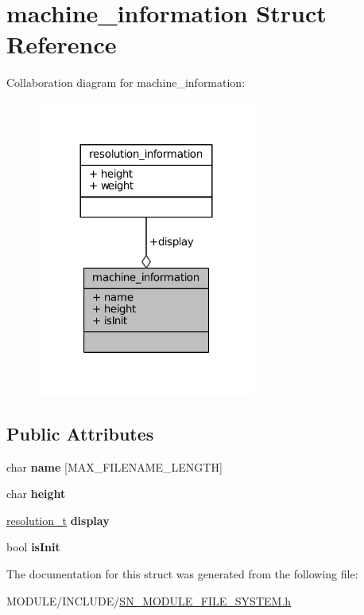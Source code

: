 \hypertarget{structmachine__information}{}\section{machine\+\_\+information Struct Reference}
\label{structmachine__information}


Collaboration diagram for machine\+\_\+information\+:\nopagebreak
\begin{figure}[H]
\begin{center}
\leavevmode
\includegraphics[width=204pt]{structmachine__information__coll__graph}
\end{center}
\end{figure}
\subsection*{Public Attributes}
\begin{DoxyCompactItemize}
\item 
\mbox{\label{structmachine__information_ab98ac9579a14ca6351a586f6fe71aa7d}} 
char {\bfseries name} \mbox{[}M\+A\+X\+\_\+\+F\+I\+L\+E\+N\+A\+M\+E\+\_\+\+L\+E\+N\+G\+TH\mbox{]}
\item 
\mbox{\label{structmachine__information_afefc7bdff98f1d03477ac6f4175c65be}} 
char {\bfseries height}
\item 
\mbox{\label{structmachine__information_a8bba79e68a84d4f574247a1b069cb76b}} 
\hyperlink{structresolution__information}{resolution\+\_\+t} {\bfseries display}
\item 
\mbox{\label{structmachine__information_a2e4f3a82636bc57169cc5fcd3e9266ab}} 
bool {\bfseries is\+Init}
\end{DoxyCompactItemize}


The documentation for this struct was generated from the following file\+:\begin{DoxyCompactItemize}
\item 
M\+O\+D\+U\+L\+E/\+I\+N\+C\+L\+U\+D\+E/\hyperlink{SN__MODULE__FILE__SYSTEM_8h}{S\+N\+\_\+\+M\+O\+D\+U\+L\+E\+\_\+\+F\+I\+L\+E\+\_\+\+S\+Y\+S\+T\+E\+M.\+h}\end{DoxyCompactItemize}

